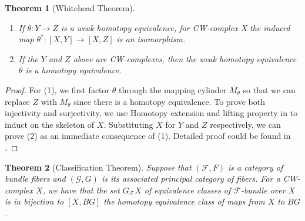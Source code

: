 \documentclass[psamsfonts]{amsart}
\newtheorem{thm}{Theorem}[section]
\theoremstyle{definition}
\theoremstyle{remark}
\numberwithin{equation}{section}
\begin{document}
\begin{thm}[Whitehead Theorem] \leavevmode
\label{thm:whiteHead}
\begin{enumerate}
\item If $\theta: Y \to Z$ is a weak homotopy equivalence, for CW-complex X the induced map $\theta^{*}: [X,Y] \to [X, Z]$ is an isomorphism.
\item If the $Y$ and $Z$ above are CW-complexes, then the weak homotopy equivalence $\theta$ is a homotopy equivalence.
\end{enumerate}

\end{thm}
\begin{proof}
For (1), we first factor $\theta$ through the mapping cylinder $M_{\theta}$ so that we can replace $Z$ with $M_{\theta}$ since there is a homotopy equivalence. To prove both injectivity and surjectivity, we use Homotopy extension and lifting property in \cite[Page 75]{Concise} to induct on the skeleton of $X$. Substituting $X$ for $Y$ and $Z$ respectively, we can prove (2) as an immediate consequence of (1). Detailed proof could be found in \cite[Page 76]{Concise}.
\end{proof}

\begin{thm} [Classification Theorem]
\label{thm:classification}
Suppose that $(\mathcal{F}, F)$ is a category of bundle fibers and $(\mathcal{G}, G)$ is its associated principal category of fibers. For a CW-complex $X$, we have that the set $G_{\mathcal{F}}X$ of equivalence classes of $\mathcal{F}$-bundle over $X$ is in bijection to $[X, BG]$ the homotopy equivalence class of maps from $X$ to $BG$.
\end{thm}
\end{document}
